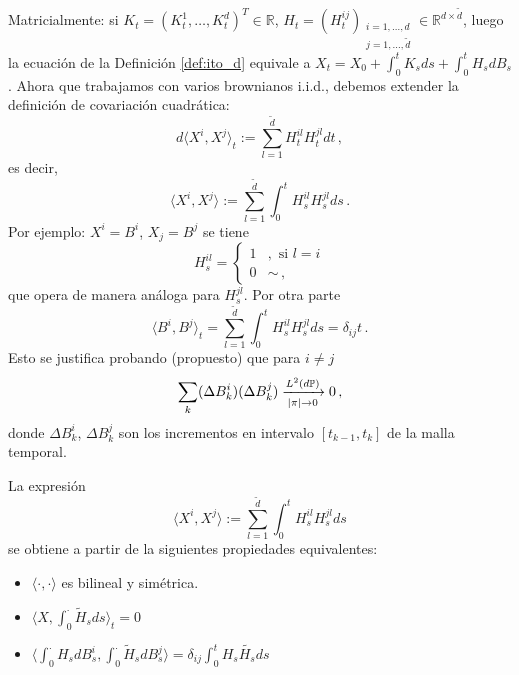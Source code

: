 Matricialmente: si $K_t = (K_t^1, \ldots, K_t^d)^T \in \mathbb{R}$, $H_t = (H_t^{ij})_{\substack{i = 1,\ldots, d \\ j=1,\ldots,\tilde{d}}} \in \mathbb{R}^{d \times \tilde{d}}$, luego la ecuación de la Definición \ref{def:ito_d} equivale a $X_t = X_0 + \int_{0}^{t} K_s ds + \int_{0}^{t} H_s dB_s$. 
\newp Ahora que trabajamos con varios brownianos i.i.d., debemos extender la definición de covariación 
cuadrática:
\begin{equation*}
    d\langle X^{i}, X^{j} \rangle_t := \sum_{l=1}^{\tilde{d}} H_{t}^{il} H_{t}^{jl} dt \,,
\end{equation*}
es decir, 
\begin{equation*}
    \label{eq:sde_7}        
    \langle X^{i}, X^{j} \rangle := \sum_{l=1}^{\tilde{d}} \int_{0}^{t} H_{s}^{il} H_{s}^{jl} ds \,.
\end{equation*}
Por ejemplo: $X^i = B^i$, $X_j = B^j$ se tiene 
\begin{equation*}
     H_{s}^{il} = 
    \begin{cases}
         1 &, \text{ si } l=i \\
         0 & \sim \,,
    \end{cases}
\end{equation*}
que opera de manera análoga para $H^{jl}_s$. Por otra parte 
\begin{equation*}
    \langle B^i, B^j \rangle_t = \sum_{l=1}^{\tilde{d}} \int_{0}^{t} H_s^{il} H_s^{jl} ds = \delta_{ij} t \,.
\end{equation*}
Esto se justifica probando (propuesto) que para $i \neq j$ 
\begin{equation*}
    \sum_{k} (\Delta B_k^i)(\Delta B_k^j) \xrightarrow[\abs{\pi} \to 0]{L^2(d\mathbb{P})} 0 \,,
\end{equation*}
donde $\Delta B_k^i$, $\Delta B_k^j$ son los incrementos en intervalo
$[t_{k-1}, t_{k}]$ de la malla temporal.
\begin{remark}
La expresión
    $$ \langle X^{i}, X^{j} \rangle := \sum_{l=1}^{\tilde{d}} \int_{0}^{t} H_{s}^{il} H_{s}^{jl} ds$$ se obtiene a partir de la siguientes propiedades equivalentes: 
    \begin{itemize}
        \item $\langle \cdot , \cdot  \rangle$ es bilineal y simétrica. 
        \item $\displaystyle \langle X, \int_{0}^{\cdot} \tilde{H}_s ds \rangle_t = 0$ 
        \item $\displaystyle \langle \int_{0}^{\cdot} H_s dB_s^i, \int_{0}^{\cdot } \tilde{H}_s dB_s^j \rangle = \delta_{ij} \int_0^t H_s \tilde{H_s} ds$
    \end{itemize}
\end{remark}
